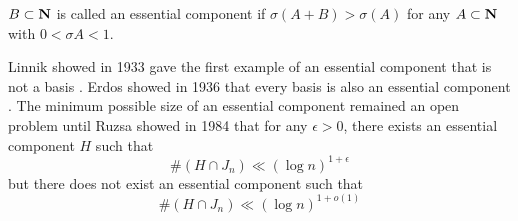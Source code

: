 \begin{definition}
    $B\subset \mathbf{N}$ is called an essential component if $\sigma(A+B)>\sigma(A)$ for any $A\subset\mathbf{N}$ with $0<\sigma A<1$.
\end{definition}

Linnik showed in 1933 gave the first example of an essential component that is not a basis \cite{zbMATH03105552}.
Erdos showed in 1936 that every basis is also an essential component \cite{Erdos1935}.
The minimum possible size of an essential component remained an open problem until Ruzsa showed in 1984\cite{Ruzsa_1987} that for any $\epsilon>0$, there exists an essential component $H$ such that
$$\#(H\cap J_n)\ll (\log n)^{1+\epsilon}$$ but there does not exist an essential component such that
$$\#(H\cap J_n)\ll(\log  n)^{1+o(1)}$$
